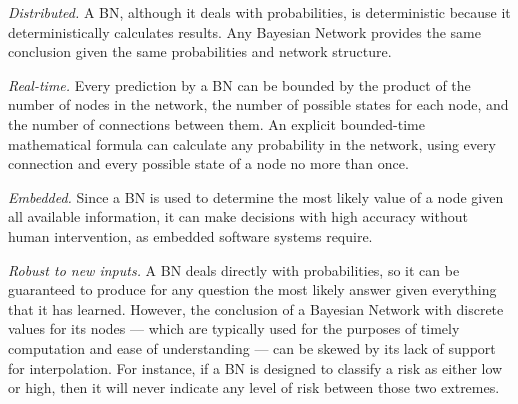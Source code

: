 \documentclass[conference]{IEEEtran}
\begin{document}
	\emph{Distributed.} A BN, although it deals with probabilities, is deterministic because it deterministically calculates results. Any Bayesian Network provides the same conclusion given the same probabilities and network structure.
	
	\emph{Real-time.} Every prediction by a BN
can be bounded by the product of the number of nodes in the network, the number of possible states for each node, and the number of connections between them.
An explicit bounded-time mathematical formula can calculate any probability in the network, using every connection and every possible state of a node no more than once.
	
	\emph{Embedded.} Since a BN is used to determine the most likely value of a node given all available information, it can make decisions with high accuracy without human intervention, as embedded software systems require.
	
	\emph{Robust to new inputs.} A BN deals directly with probabilities, so it can be guaranteed to produce for any question the most likely answer given everything that it has learned. However, the conclusion of a Bayesian Network with discrete values for its nodes --- which are typically used for the purposes of timely computation and ease of understanding
--- can be skewed by its lack of support for interpolation.
For instance, if a BN is designed to classify a risk as either low or high, then it will never indicate any level of risk between those two extremes.
	
\end{document}
